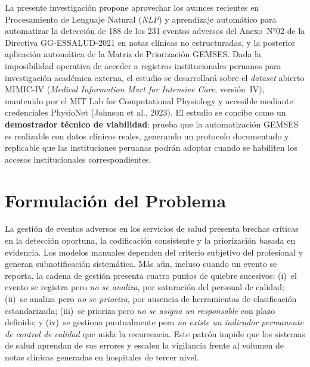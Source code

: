 \documentclass[12pt,a4paper,oneside]{book}
\begin{document}
La presente investigación propone aprovechar los avances recientes en Procesamiento de Lenguaje Natural (\textit{NLP}) y aprendizaje automático para automatizar la detección de 188 de los 231 eventos adversos del Anexo~N°02 de la Directiva GG-ESSALUD-2021 en notas clínicas no estructuradas, y la posterior aplicación automática de la Matriz de Priorización GEMSES. Dada la imposibilidad operativa de acceder a registros institucionales peruanos para investigación académica externa, el estudio se desarrollará sobre el \textit{dataset} abierto MIMIC-IV (\textit{Medical Information Mart for Intensive Care}, versión~IV), mantenido por el MIT Lab for Computational Physiology y accesible mediante credenciales PhysioNet (Johnson et al., 2023). El estudio se concibe como un \textbf{demostrador técnico de viabilidad}: prueba que la automatización GEMSES es realizable con datos clínicos reales, generando un protocolo documentado y replicable que las instituciones peruanas podrán adoptar cuando se habiliten los accesos institucionales correspondientes.

\section{Formulación del Problema}

La gestión de eventos adversos en los servicios de salud presenta brechas críticas en la detección oportuna, la codificación consistente y la priorización basada en evidencia. Los modelos manuales dependen del criterio subjetivo del profesional y generan subnotificación sistemática. Más aún, incluso cuando un evento se reporta, la cadena de gestión presenta cuatro puntos de quiebre sucesivos: (i)~el evento se registra pero \textit{no se analiza}, por saturación del personal de calidad; (ii)~se analiza pero \textit{no se prioriza}, por ausencia de herramientas de clasificación estandarizada; (iii)~se prioriza pero \textit{no se asigna un responsable} con plazo definido; y (iv)~se gestiona puntualmente pero \textit{no existe un indicador permanente de control de calidad} que mida la recurrencia. Este patrón impide que los sistemas de salud aprendan de sus errores y escalen la vigilancia frente al volumen de notas clínicas generadas en hospitales de tercer nivel.
\end{document}
